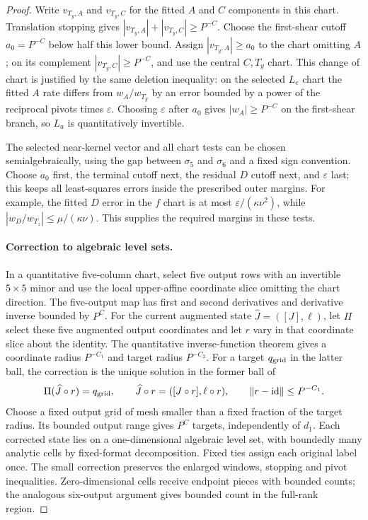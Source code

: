 \documentclass[11pt]{amsart}
\theoremstyle{definition}
\theoremstyle{remark}
\numberwithin{equation}{section}
\begin{document}
\begin{proof}
Write $v_{T_y,A}$ and $v_{T_y,C}$ for the fitted $A$ and $C$ components in this chart. Translation stopping gives $|v_{T_y,A}|+|v_{T_y,C}|\ge P^{-C}$. Choose the first-shear cutoff $a_0=P^{-C}$ below half this lower bound. Assign $|v_{T_y,A}|\ge a_0$ to the chart omitting $A$; on its complement $|v_{T_y,C}|\ge P^{-C}$, and use the central $C,T_y$ chart. This change of chart is justified by the same deletion inequality: on the selected $L_e$ chart the fitted $A$ rate differs from $w_A/w_{T_y}$ by an error bounded by a power of the reciprocal pivots times $\varepsilon$. Choosing $\varepsilon$ after $a_0$ gives $|w_A|\ge P^{-C}$ on the first-shear branch, so $L_a$ is quantitatively invertible.

The selected near-kernel vector and all chart tests can be chosen semialgebraically, using the gap between $\sigma_5$ and $\sigma_6$ and a fixed sign convention. Choose $a_0$ first, the terminal cutoff next, the residual $D$ cutoff next, and $\varepsilon$ last; this keeps all least-squares errors inside the prescribed outer margins. For example, the fitted $D$ error in the $f$ chart is at most $\varepsilon/(\kappa\nu^2)$, while $|w_D/w_{T_z}|\le\mu/(\kappa\nu)$. This supplies the required margins in these tests.

\paragraph{Correction to algebraic level sets.}

In a quantitative five-column chart, select five output rows with an invertible $5\times5$ minor and use the local upper-affine coordinate slice omitting the chart direction. The five-output map has first and second derivatives and derivative inverse bounded by $P^C$. For the current augmented state $\widehat J=([J],\ell)$, let $\Pi$ select these five augmented output coordinates and let $r$ vary in that coordinate slice about the identity. The quantitative inverse-function theorem gives a coordinate radius $P^{-C_1}$ and target radius $P^{-C_2}$. For a target $q_{\rm grid}$ in the latter ball, the correction is the unique solution in the former ball of
\[
\Pi(\widehat J\circ r)=q_{\rm grid},\qquad \widehat J\circ r=([J\circ r],\ell\circ r),\qquad \|r-\mathrm{id}\|\le P^{-C_1}.
\]
Choose a fixed output grid of mesh smaller than a fixed fraction of the target radius. Its bounded output range gives $P^C$ targets, independently of $d_1$. Each corrected state lies on a one-dimensional algebraic level set, with boundedly many analytic cells by fixed-format decomposition. Fixed ties assign each original label once. The small correction preserves the enlarged windows, stopping and pivot inequalities. Zero-dimensional cells receive endpoint pieces with bounded counts; the analogous six-output argument gives bounded count in the full-rank region.


\end{proof}
\end{document}
